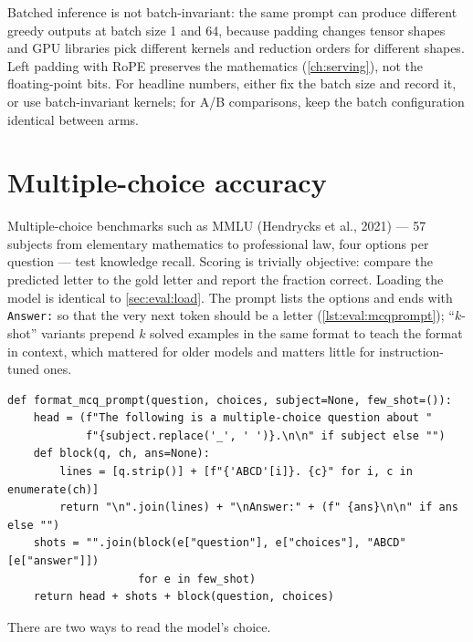 \begin{systemslens}
Batched inference is not batch-invariant: the same prompt can produce different greedy outputs at
batch size 1 and 64, because padding changes tensor shapes and GPU libraries pick different
kernels and reduction orders for different shapes. Left padding with RoPE preserves the
mathematics (\cref{ch:serving}), not the floating-point bits. For headline numbers, either fix the
batch size and record it, or use batch-invariant kernels; for A/B comparisons, keep the batch
configuration identical between arms.
\end{systemslens}

\section{Multiple-choice accuracy}\label{sec:eval:mcq}

Multiple-choice benchmarks such as MMLU (Hendrycks et al., 2021) --- 57 subjects from
elementary mathematics to professional law, four options per question --- test knowledge recall.
Scoring is trivially objective: compare the predicted letter to the gold letter and report the
fraction correct. Loading the model is identical to \cref{sec:eval:load}. The prompt lists the
options and ends with \texttt{Answer:} so that the very next token should be a letter
(\cref{lst:eval:mcqprompt}); ``$k$-shot'' variants prepend $k$ solved examples in the same format
to teach the format in context, which mattered for older models and matters little for
instruction-tuned ones.

\begin{lstlisting}[caption={An MMLU-style prompt that ends where a letter should follow.},label={lst:eval:mcqprompt}]
def format_mcq_prompt(question, choices, subject=None, few_shot=()):
    head = (f"The following is a multiple-choice question about "
            f"{subject.replace('_', ' ')}.\n\n" if subject else "")
    def block(q, ch, ans=None):
        lines = [q.strip()] + [f"{'ABCD'[i]}. {c}" for i, c in enumerate(ch)]
        return "\n".join(lines) + "\nAnswer:" + (f" {ans}\n\n" if ans else "")
    shots = "".join(block(e["question"], e["choices"], "ABCD"[e["answer"]])
                    for e in few_shot)
    return head + shots + block(question, choices)
\end{lstlisting}

There are two ways to read the model's choice.

